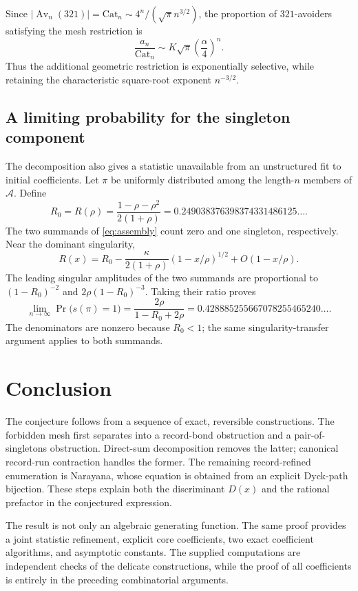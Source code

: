\documentclass[11pt,a4paper]{article}
\theoremstyle{definition}
\theoremstyle{remark}
\newcommand{\Av}{\operatorname{Av}}
\newcommand{\Cat}{\mathrm{Cat}}
\newcommand{\class}{\mathcal{A}}
\begin{document}
Since $|\Av_n(321)|=\Cat_n\sim4^n/(\sqrt\pi n^{3/2})$, the proportion
of $321$-avoiders satisfying the mesh restriction is
\begin{equation}\label{eq:proportion}
 \frac{a_n}{\Cat_n}\sim K\sqrt\pi\left(\frac{\alpha}{4}\right)^n.
\end{equation}
Thus the additional geometric restriction is exponentially selective,
while retaining the characteristic square-root exponent $n^{-3/2}$.

\subsection{A limiting probability for the singleton component}

The decomposition also gives a statistic unavailable from an unstructured
fit to initial coefficients. Let $\pi$ be uniformly distributed among the
length-$n$ members of $\class$. Define
\[
 R_0=R(\rho)=\frac{1-\rho-\rho^2}{2(1+\rho)}
       =0.249038376398374331486125\ldots.
\]
The two summands of \eqref{eq:assembly} count zero and one singleton,
respectively. Near the dominant singularity,
\[
 R(x)=R_0-\frac{\kappa}{2(1+\rho)}(1-x/\rho)^{1/2}
       +O(1-x/\rho).
\]
The leading singular amplitudes of the two summands are proportional to
$(1-R_0)^{-2}$ and $2\rho(1-R_0)^{-3}$. Taking their ratio proves
\begin{equation}\label{eq:singletonlimit}
 \boxed{\displaystyle
 \lim_{n\to\infty}\Pr\bigl(s(\pi)=1\bigr)
 =\frac{2\rho}{1-R_0+2\rho}
 =0.428885255667078255465240\ldots.}
\end{equation}
The denominators are nonzero because $R_0<1$; the same singularity-transfer
argument applies to both summands.

\section{Conclusion}

The conjecture follows from a sequence of exact, reversible constructions.
The forbidden mesh first separates into a record-bond obstruction and a
pair-of-singletons obstruction. Direct-sum decomposition removes the
latter; canonical record-run contraction handles the former. The remaining
record-refined enumeration is Narayana, whose equation is obtained from an
explicit Dyck-path bijection. These steps explain both the discriminant
$D(x)$ and the rational prefactor in the conjectured expression.

The result is not only an algebraic generating function. The same proof
provides a joint statistic refinement, explicit core coefficients, two exact
coefficient algorithms, and asymptotic constants. The supplied computations
are independent checks of the delicate constructions, while the proof of
all coefficients is entirely in the preceding combinatorial arguments.
\end{document}
